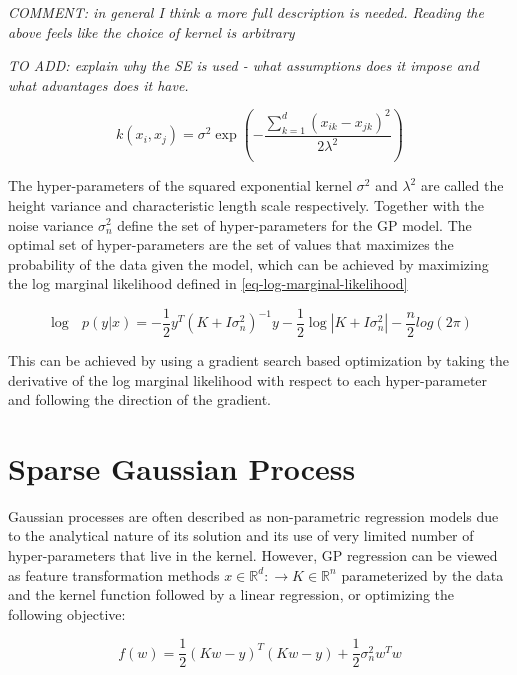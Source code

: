 \documentclass[useAMS,usenatbib,fleqn]{mn2e}
\begin{document}
\textit{COMMENT: in general I think a more full description is needed. Reading the above feels like the choice of kernel is arbitrary}

\textit{TO ADD: explain why the SE is used - what assumptions does it impose and what advantages does it have.}

\begin{equation}
\label{eq-squared-exponential}
k(x_{i},x_{j}) = \sigma^{2} \exp \left ( -\frac{\sum_{k=1}^{d} ( x_{ik}-x_{jk} )^{2}} {2\lambda^{2}} \right )
\end{equation}

The hyper-parameters of the squared exponential kernel $\sigma^{2}$ and $\lambda^{2}$ are called the height variance and characteristic length scale respectively. Together with the noise variance $\sigma_{n}^{2}$ define the set of hyper-parameters for the GP model. The optimal set of hyper-parameters are the set of values that maximizes the probability of the data given the model, which can be achieved by maximizing the log marginal likelihood defined in \eqref{eq-log-marginal-likelihood} 

\begin{equation}
\label{eq-log-marginal-likelihood}
\log\text{ }p(y|x) = -\frac{1}{2}y^{T}\left(K+I\sigma_{n}^{2} \right)^{-1}y-\frac{1}{2} \log\left | K+I\sigma_{n}^{2}\right|-\frac{n}{2}log(2\pi)
\end{equation}

This can be achieved by using a gradient search based optimization by taking the derivative of the log marginal likelihood with respect to each hyper-parameter and following the direction of the gradient.

\section{Sparse Gaussian Process}
\label{sec-sparse-gaussian-process}
Gaussian processes are often described as non-parametric regression models due to the analytical nature of its solution and its use of very limited number of hyper-parameters that live in the kernel. However, GP regression can be viewed as feature transformation methods $x\in \mathbb{R}^{d}:\rightarrow K\in \mathbb{R}^{n}$ parameterized by the data and the kernel function followed by a linear regression, or optimizing the following objective:

\begin{equation}
\label{eq-linear-regression-objective}
f(w)=\frac{1}{2}\left ( Kw-y \right )^{T} \left( Kw-y \right )+\frac{1}{2}\sigma_{n}^{2}w^{T}w
\end{equation}
\end{document}
